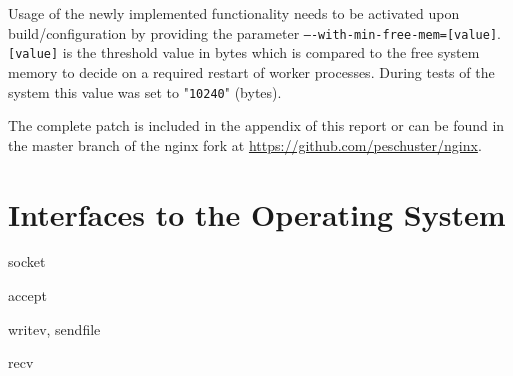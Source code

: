 Usage of the newly implemented functionality needs to be activated upon build/configuration by providing the parameter \texttt{----with-min-free-mem=[value]}. \texttt{[value]} is the threshold value in bytes which is compared to the free system memory to decide on a required restart of worker processes. During tests of the system this value was set to "\texttt{10240}" (bytes).

The complete patch is included in the appendix of this report or can be found in the master branch of the nginx fork at \url{https://github.com/peschuster/nginx}.

\section{Interfaces to the Operating System}

socket

accept

writev, sendfile

recv